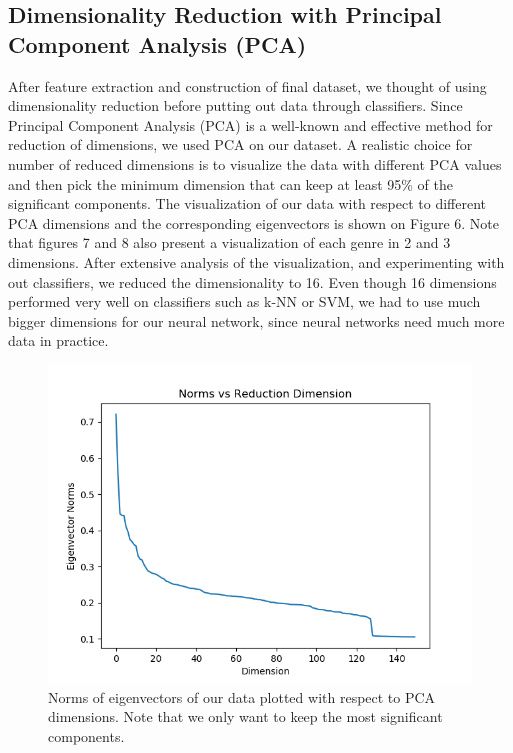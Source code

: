 \subsection{Dimensionality Reduction with Principal Component Analysis (PCA)}
After feature extraction and construction of final dataset, we thought of using dimensionality reduction before putting out data through classifiers. Since Principal Component Analysis (PCA) is a well-known and effective method for reduction of dimensions, we used PCA on our dataset. A realistic choice for number of reduced dimensions is to visualize the data with different PCA values and then pick the minimum dimension that can keep at least 95\% of the significant components. The visualization of our data with respect to different PCA dimensions and the corresponding eigenvectors is shown on Figure 6. Note that figures 7 and 8 also present a visualization of each genre in 2 and 3 dimensions. After extensive analysis of the visualization, and experimenting with out classifiers, we reduced the dimensionality to 16. Even though 16 dimensions performed very well on classifiers such as k-NN or SVM, we had to use much bigger dimensions for our neural network, since neural networks need much more data in practice. 

\begin{figure}
\begin{center}
\includegraphics[scale=0.3]{./figures/pca_eig.png}
\end{center}
\caption
{
Norms of eigenvectors of our data plotted with respect to PCA dimensions. Note that we only want to keep the most significant components.
}
\label{fig:big_picture5}
\end{figure}

